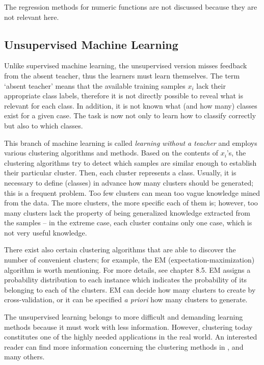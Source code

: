 The regression methods for numeric functions are not discussed because they
are not relevant here.

\subsection{Unsupervised Machine Learning}
Unlike supervised machine learning, the unsupervised version misses feedback
from the absent teacher, thus the learners must learn themselves. The term ‘absent teacher’ means that the available training samples $x_i$
lack their appropriate class labels, therefore it is not directly possible to reveal what is relevant for each
class. In addition, it is not known what (and how many) classes exist for a given
case. The task is now not only to learn how to classify correctly but also to which
classes.

This branch of machine learning is called \emph{learning without a teacher} and employs various clustering algorithms and methods. Based on the contents of $x_i$’s,
the clustering algorithms try to detect which samples are similar enough to establish their particular cluster. Then, each cluster represents a class. Usually, it
is necessary to define (classes) in advance how many clusters should be generated; this is a frequent problem. Too few clusters can mean too vague knowledge mined from the data. The more clusters, the more specific each of them
is; however, too many clusters lack the property of being generalized knowledge
extracted from the samples – in the extreme case, each cluster contains only one
case, which is not very useful knowledge.

There exist also certain clustering algorithms that are able to discover the
number of convenient clusters; for example, the EM (expectation-maximization)
algorithm is worth mentioning. For more details, see \cite{ref112} chapter 8.5. 
EM assigns a probability distribution to each instance which indicates the probability of
its belonging to each of the clusters. EM can decide how many clusters to create
by cross-validation, or it can be specified \emph{a priori} how many clusters to generate.

The unsupervised learning belongs to more difficult and demanding learning
methods because it must work with less information. However, clustering today
constitutes one of the highly needed applications in the real world. An interested
reader can find more information concerning the clustering methods in \cite{ref142,ref230,ref22,ref254}, and many others.

